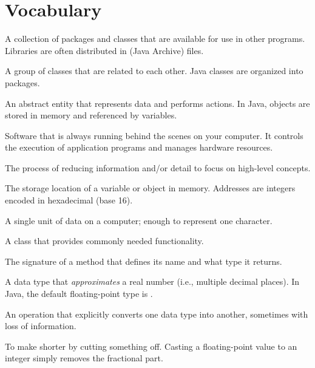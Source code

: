 \section{Vocabulary}

\begin{description}

A collection of packages and classes that are available for use in other programs.
Libraries are often distributed in  (Java Archive) files.

A group of classes that are related to each other.
Java classes are organized into packages.

An abstract entity that represents data and performs actions.
In Java, objects are stored in memory and referenced by variables.

Software that is always running behind the scenes on your computer.
It controls the execution of application programs and manages hardware resources.

The process of reducing information and/or detail to focus on high-level concepts.

The storage location of a variable or object in memory.
Addresses are integers encoded in hexadecimal (base 16).

A single unit of data on a computer; enough to represent one character.

A class that provides commonly needed functionality.

The signature of a method that defines its name and what type it returns.

A data type that {\em approximates} a real number (i.e., multiple decimal places).
In Java, the default floating-point type is .

An operation that explicitly converts one data type into another, sometimes with loss of information.

To make shorter by cutting something off.
Casting a floating-point value to an integer simply removes the fractional part.

\end{description}
